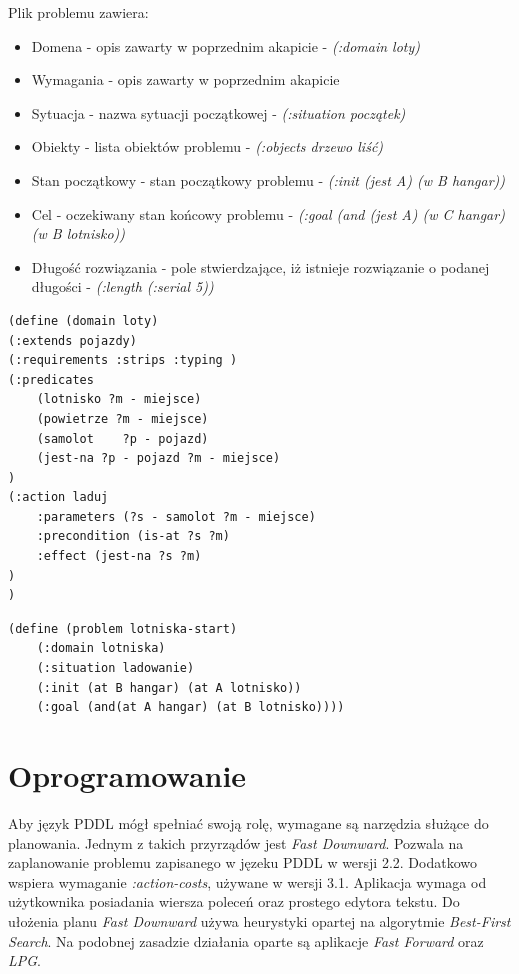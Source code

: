 Plik problemu zawiera:
\begin{itemize}
\item Domena - opis zawarty w poprzednim akapicie - \textit{(:domain loty)}
\item Wymagania - opis zawarty w poprzednim akapicie
\item Sytuacja - nazwa sytuacji początkowej - \textit{(:situation początek)}
\item Obiekty - lista obiektów problemu - \textit{(:objects drzewo liść)}
\item Stan początkowy - stan początkowy problemu - \textit{(:init (jest A) (w B hangar))}
\item Cel - oczekiwany stan końcowy problemu - \textit{(:goal (and (jest A) (w C hangar) (w B lotnisko))}
\item Długość rozwiązania - pole stwierdzające, iż istnieje rozwiązanie o podanej długości - \textit{(:length (:serial 5))}
\end{itemize}
\begin{Code}
\begin{lstlisting}[language=LISP,frame=single,label=ana_code, caption=Zawartość przykładowego pliku domeny]
(define (domain loty)
(:extends pojazdy)
(:requirements :strips :typing )
(:predicates
	(lotnisko ?m - miejsce)
	(powietrze ?m - miejsce)
	(samolot	?p - pojazd)
	(jest-na ?p - pojazd ?m - miejsce)
)
(:action laduj
	:parameters (?s - samolot ?m - miejsce)
   	:precondition (is-at ?s ?m) 
	:effect (jest-na ?s ?m) 
)
)
\end{lstlisting}
\end{Code}

\begin{Code}
\begin{lstlisting}[language=LISP,frame=single,label=ana_code, caption=Zawartość przykładowego pliku problemu]
(define (problem lotniska-start)
	(:domain lotniska)
	(:situation ladowanie)
	(:init (at B hangar) (at A lotnisko))
	(:goal (and(at A hangar) (at B lotnisko))))
\end{lstlisting}
\end{Code}

\section{Oprogramowanie}
Aby język PDDL mógł spełniać swoją rolę, wymagane są narzędzia służące do planowania. Jednym z takich przyrządów jest \textit{Fast Downward}. Pozwala na zaplanowanie problemu zapisanego w jęzeku PDDL w wersji 2.2. Dodatkowo wspiera wymaganie \textit{:action-costs}, używane w wersji 3.1. Aplikacja wymaga od użytkownika posiadania wiersza poleceń oraz prostego edytora tekstu. Do ułożenia planu \textit{Fast Downward} używa heurystyki opartej na algorytmie \textit{Best-First Search}. Na podobnej zasadzie działania oparte są aplikacje \textit{Fast Forward} oraz \textit{LPG}.

